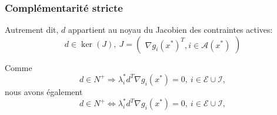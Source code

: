 \documentclass[usepdftitle=false,aspectratio=169]{beamer}
\def\cA{\mathcal{A}}
\def\cE{\mathcal{E}}
\def\cI{\mathcal{I}}
\begin{document}
\begin{frame}
\frametitle{Complémentarité stricte}

Autrement dit, $d$ appartient au noyau du Jacobien des contraintes actives:
$$
d \in \ker(J),\ J = \begin{pmatrix} \nabla g_i(x^*)^T, i \in \cA(x^*) \end{pmatrix}
$$

\mbox{}

Comme
$$
d \in N^+
\Rightarrow
\lambda_i^* d^T \nabla g_i(x^*) = 0,\ i \in \cE \cup \cI,
$$
nous avons également
$$
d \in N^+
\Leftrightarrow
\lambda_i^* d^T \nabla g_i(x^*) = 0,\ i \in \cE \cup \cI,
$$

\end{frame}
\end{document}
